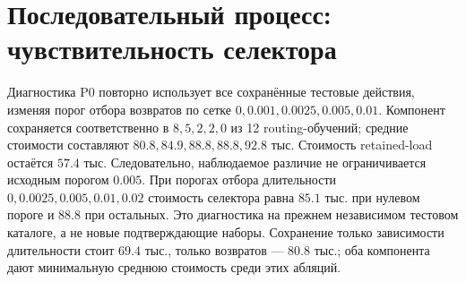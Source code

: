 \section{Последовательный процесс: чувствительность селектора}
Диагностика P0 повторно использует все сохранённые тестовые действия, изменяя порог отбора возвратов по сетке $0,0.001,0.0025,0.005,0.01$. Компонент сохраняется соответственно в $8,5,2,2,0$ из 12 routing-обучений; средние стоимости составляют $80.8,84.9,88.8,88.8,92.8$ тыс. Стоимость retained-load остаётся $57.4$ тыс. Следовательно, наблюдаемое различие не ограничивается исходным порогом $0.005$. При порогах отбора длительности $0,0.0025,0.005,0.01,0.02$ стоимость селектора равна $85.1$ тыс. при нулевом пороге и $88.8$ при остальных. Это диагностика на прежнем независимом тестовом каталоге, а не новые подтверждающие наборы. Сохранение только зависимости длительности стоит $69.4$ тыс., только возвратов — $80.8$ тыс.; оба компонента дают минимальную среднюю стоимость среди этих абляций.
